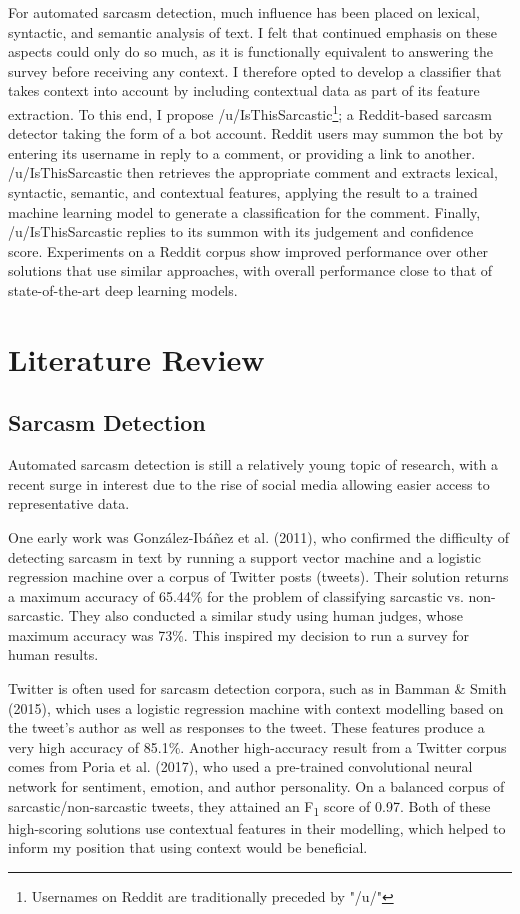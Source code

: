 \documentclass[a4paper,12pt]{article}
\let\stdsection\section
\renewcommand\section{\newpage\stdsection}
\begin{document}
For automated sarcasm detection, much influence has been placed on lexical, syntactic, and semantic analysis of text. I felt that continued emphasis on these aspects could only do so much, as it is functionally equivalent to answering the survey before receiving any context. I therefore opted to develop a classifier that takes context into account by including contextual data as part of its feature extraction. To this end, I propose /u/IsThisSarcastic\footnote{Usernames on Reddit are traditionally preceded by "/u/"}; a Reddit-based sarcasm detector taking the form of a bot account. Reddit users may summon the bot by entering its username in reply to a comment, or providing a link to another. /u/IsThisSarcastic then retrieves the appropriate comment and extracts lexical, syntactic, semantic, and contextual features, applying the result to a trained machine learning model to generate a classification for the comment. Finally, /u/IsThisSarcastic replies to its summon with its judgement and confidence score. Experiments on a Reddit corpus show improved performance over other solutions that use similar approaches, with overall performance close to that of state-of-the-art deep learning models.


\section{Literature Review}
\subsection{Sarcasm Detection}
Automated sarcasm detection is still a relatively young topic of research, with a recent surge in interest due to the rise of social media allowing easier access to representative data. 

One early work was González-Ibáñez et al. (2011), who confirmed the difficulty of detecting sarcasm in text by running a support vector machine and a logistic regression machine over a corpus of Twitter posts (tweets). Their solution returns a maximum accuracy of 65.44\% for the problem of classifying sarcastic vs. non-sarcastic. They also conducted a similar study using human judges, whose maximum accuracy was 73\%. This inspired my decision to run a survey for human results.

Twitter is often used for sarcasm detection corpora, such as in Bamman \& Smith (2015), which uses a logistic regression machine with context modelling based on the tweet's author as well as responses to the tweet. These features produce a very high accuracy of 85.1\%. Another high-accuracy result from a Twitter corpus comes from Poria et al. (2017), who used a pre-trained convolutional neural network for sentiment, emotion, and author personality. On a balanced corpus of sarcastic/non-sarcastic tweets, they attained an F\textsubscript{1} score of 0.97. Both of these high-scoring solutions use contextual features in their modelling, which helped to inform my position that using context would be beneficial.
\end{document}
